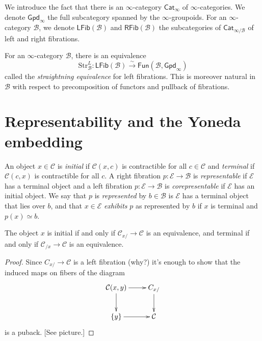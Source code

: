 \medskip\noindent
We introduce the fact that there is an $\infty$-category $\mathsf{Cat}_\infty$
of $\infty$-categories. We denote $\mathsf{Gpd}_\infty$ 
the full subcategory spanned by the $\infty$-groupoids.
For an $\infty$-category $\mathcal{B}$,
we denote $\mathsf{LFib}(\mathcal{B})$ and $\mathsf{RFib}(\mathcal{B})$
the subcategories of $\mathsf{Cat}_{\infty/\mathcal{B}}$
of left and right fibrations.

\begin{theorem}[Lurie]
\label{theorem-lurie}
For an $\infty$-category $\mathcal{B}$, there is an equivalence
$$
\text{Str}_{\mathcal{B}}^L:\mathsf{LFib}(\mathcal{B})
\overset{\sim}{\to}\mathsf{Fun}(\mathcal{B},\mathsf{Gpd}_\infty)
$$
called the {\it straightning equivalence} for left fibrations.
This is moreover natural in $\mathcal{B}$ with respect
to precomposition of functors and pullback of fibrations.
\end{theorem}

\section{Representability and the Yoneda embedding}
\label{section-representability}

\noindent
An object $x \in \mathcal{C}$ is {\it initial } if $\mathcal{C}(x,c)$ 
is contractible for all $c \in \mathcal{C}$ and
{\it terminal} if $\mathcal{C}(c,x)$ is contractible for all $c$.
A right fibration $p:\mathcal{E} \to \mathcal{B}$ is
{\it representable} if $\mathcal{E}$ has a terminal object
and a left fibration $p:\mathcal{E} \to \mathcal{B}$ is
{\it corepresentable} if $\mathcal{E}$ has an initial object.
We say that $p$ is {\it represented} by $b \in \mathcal{B}$
is $\mathcal{E}$ has a terminal object that lies over $b$,
and that $x \in \mathcal{E}$ {\it exhibits} $p$ 
as represented by $b$ if $x$ is terminal
and $p(x)\simeq b$.

\begin{lemma}
\label{lemma-equivalence-iff-initial}
The object $x$ is initial if and only if $\mathcal{C}_{x/}\to \mathcal{C}$ 
is an equivalence, and terminal if and only if $\mathcal{C}_{/x}\to \mathcal{C}$ 
is an equivalence.
\end{lemma}

\begin{proof}
Since $C_{x/}\to \mathcal{C}$ is a left fibration (why?)
it's enough to show that the induced maps on fibers of
the diagram
$$
\xymatrix{
\mathcal{C}(x,y)\ar[r]\ar[d]&C_{x/}\ar[d]\\
\{y\}\ar[r]&\mathcal{C}
}
$$
is a puback. [See picture.]
\end{proof}

